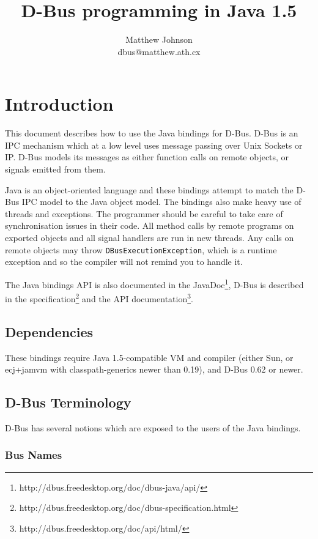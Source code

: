 \documentclass[a4paper,12pt]{article}
\author{Matthew Johnson\\dbus@matthew.ath.cx}
\title{D-Bus programming in Java 1.5}
\begin{document}
\def\javadocroot/{http://dbus.freedesktop.org/doc/dbus-java/api/}

\maketitle

\tableofcontents
\listoffigures
\listoftables

\section{Introduction}

This document describes how to use the Java bindings for D-Bus. D-Bus
is an IPC mechanism which at a low level uses message passing over
Unix Sockets or IP. D-Bus models its messages as either function
calls on remote objects, or signals emitted from them.

Java is an object-oriented language and these bindings attempt to
match the D-Bus IPC model to the Java object model. The bindings also
make heavy use of threads and exceptions. The programmer should be
careful to take care of synchronisation issues in their code. All
method calls by remote programs on exported objects and all signal
handlers are run in new threads. Any calls on remote objects may
throw {\tt DBusExecutionException}, which is a runtime exception and
so the compiler will not remind you to handle it.

The Java bindings API is also documented in the
JavaDoc\footnote{\javadocroot/}, D-Bus is
described in the
specification\footnote{http://dbus.freedesktop.org/doc/dbus-specification.html}
and the API
documentation\footnote{http://dbus.freedesktop.org/doc/api/html/}.

\subsection{Dependencies}

These bindings require Java 1.5-compatible VM and compiler (either
Sun, or ecj+jamvm with classpath-generics newer than 0.19), and D-Bus
0.62 or newer.

\subsection{D-Bus Terminology}

D-Bus has several notions which are exposed to the users of the Java
bindings.

\subsubsection{Bus Names}
\end{document}
